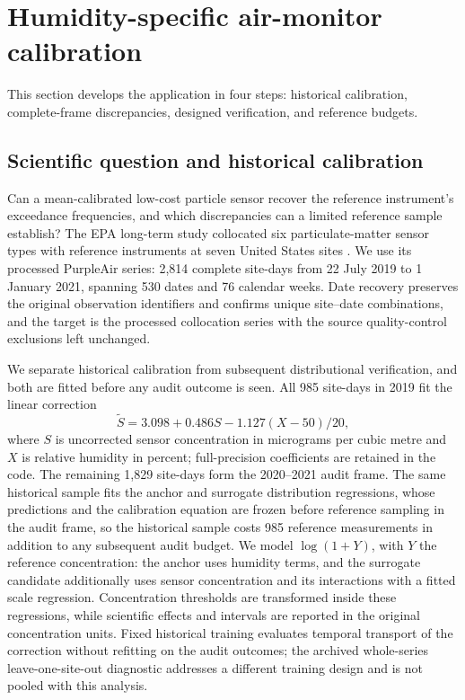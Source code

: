 \section{Humidity-specific air-monitor calibration}
\label{sec:application}
This section develops the application in four steps: historical calibration, complete-frame discrepancies, designed verification, and reference budgets.

\subsection{Scientific question and historical calibration}
Can a mean-calibrated low-cost particle sensor recover the reference instrument's exceedance frequencies, and which discrepancies can a limited reference sample establish? The EPA long-term study collocated six particulate-matter sensor types with reference instruments at seven United States sites \citep{Barkjohn2025}. We use its processed PurpleAir series: 2,814 complete site-days from 22 July 2019 to 1 January 2021, spanning 530 dates and 76 calendar weeks. Date recovery preserves the original observation identifiers and confirms unique site--date combinations, and the target is the processed collocation series with the source quality-control exclusions left unchanged.

We separate historical calibration from subsequent distributional verification, and both are fitted before any audit outcome is seen. All 985 site-days in 2019 fit the linear correction
\begin{equation}\label{eq:epacal}
 \widetilde S=3.098+0.486S-1.127(X-50)/20,
\end{equation}
where $S$ is uncorrected sensor concentration in micrograms per cubic metre and $X$ is relative humidity in percent; full-precision coefficients are retained in the code. The remaining 1,829 site-days form the 2020--2021 audit frame. The same historical sample fits the anchor and surrogate distribution regressions, whose predictions and the calibration equation are frozen before reference sampling in the audit frame, so the historical sample costs 985 reference measurements in addition to any subsequent audit budget. We model $\log(1+Y)$, with $Y$ the reference concentration: the anchor uses humidity terms, and the surrogate candidate additionally uses sensor concentration and its interactions with a fitted scale regression. Concentration thresholds are transformed inside these regressions, while scientific effects and intervals are reported in the original concentration units. Fixed historical training evaluates temporal transport of the correction without refitting on the audit outcomes; the archived whole-series leave-one-site-out diagnostic addresses a different training design and is not pooled with this analysis.

